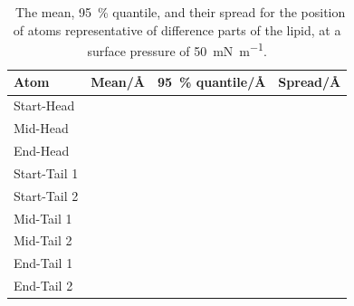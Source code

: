 \documentclass[amsmath,amssymb,superscriptaddress]{revtex4-1}
\begin{document}
%
%
\begin{table}[h]
\small
  \caption{\ The mean, \SI{95}{\percent} quantile, and their spread for the position of atoms representative of difference parts of the lipid, at a surface pressure of \SI{50}{\milli\newton\per\meter}.}
  \label{tab:spread3}
  \begin{tabular*}{0.48\textwidth}{@{\extracolsep{\fill}}llll}
    \hline
    Atom & Mean/\si{\angstrom} & \SI{95}{\percent} quantile/\si{\angstrom} & Spread/\si{\angstrom} \\
    \hline
    Start-Head &  &  &  \\
    Mid-Head &  &  &  \\
    End-Head &  &  &  \\
    \hline
    Start-Tail 1 &  &  &  \\
    Start-Tail 2 &  &  &  \\
    Mid-Tail 1 &  &  &  \\
    Mid-Tail 2 &  &  &  \\
    End-Tail 1 &  &  &  \\
    End-Tail 2 &  &  &  \\
    \hline
  \end{tabular*}
\end{table}
%


\end{document}
